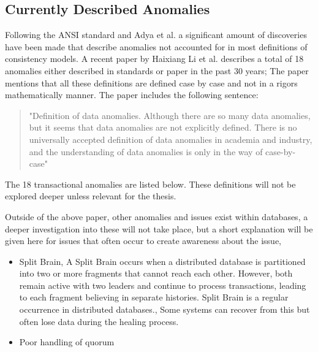 \documentclass[a4paper,10pt,titlepage]{report}
\begin{document}
\subsection{Currently Described Anomalies} 

Following the ANSI standard and Adya et al. \cite{Adya99weakconsistency} a significant amount of discoveries have been made that describe anomalies not accounted for in most definitions of consistency models. A recent paper by Haixiang Li et al. \cite{li2021coo} describes a total of 18 anomalies either described in standards or paper in the past 30 years; The paper mentions that all these definitions are defined case by case and not in a rigors mathematically manner. The paper includes the following sentence: 
\begin{quote}
    "Definition of data anomalies. Although there are so many data anomalies, but it seems that data anomalies are not explicitly defined. There is no universally accepted definition of data anomalies in academia and industry, and the understanding of data anomalies is only in the way of case-by-case" \cite{li2021coo}
\end{quote}

The 18 transactional anomalies are listed below. These definitions will not be explored deeper unless relevant for the thesis.

\vspace{2mm}

\vspace{2mm}

Outside of the above paper, other anomalies and issues exist within databases, a deeper investigation into these will not take place, but a short explanation will be given here for issues that often occur to create awareness about the issue,
\begin{itemize}
    \item Split Brain, A Split Brain occurs when a distributed database is partitioned into two or more fragments that cannot reach each other. However, both remain active with two leaders and continue to process transactions, leading to each fragment believing in separate histories. Split Brain is a regular occurrence in distributed databases.\cite{aphyrelasticsearch, jepsenscylla, jepsenhazelcast}, Some systems can recover from this but often lose data during the healing process.
    \item Poor handling of quorum
\end{itemize}
\end{document}
